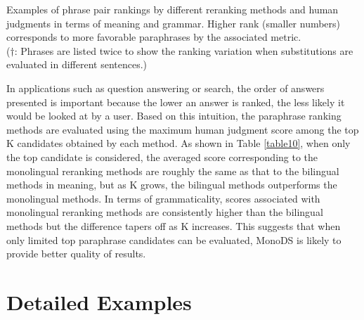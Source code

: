 \documentclass[11pt]{article}
\newcommand{\mnote}[1]{\marginpar{\raggedleft\footnotesize\itshape#1}}
\begin{document}
\begin{table}
\begin{center}
\end{center}
\caption{Examples of phrase pair rankings by different reranking methods and human judgments in terms of meaning and grammar. Higher rank (smaller numbers) corresponds to more favorable paraphrases by the associated metric. \\($\dagger$: Phrases are listed twice to show the ranking variation when substitutions are evaluated in different sentences.)\vspace{-.31cm}} %
\label{table11}
\end{table}

In applications such as question answering or search, the order of answers presented is important because the lower an answer is ranked, the less likely it would be looked at by a user. Based on this intuition, the paraphrase ranking methods are evaluated using the maximum human judgment score among the top K candidates obtained by each method. As shown in Table \ref{table10}, when only the top candidate is considered, the averaged score corresponding to the monolingual reranking methods are roughly the same as that to the bilingual methods in meaning, but as K grows, the bilingual methods outperforms the monolingual methods. In terms of grammaticality, scores associated with monolingual reranking methods are consistently higher than the bilingual methods but the difference tapers off as K increases. This suggests that when only limited top paraphrase candidates can be evaluated, MonoDS is likely to provide better quality of results.



\section{Detailed Examples}
\end{document}
